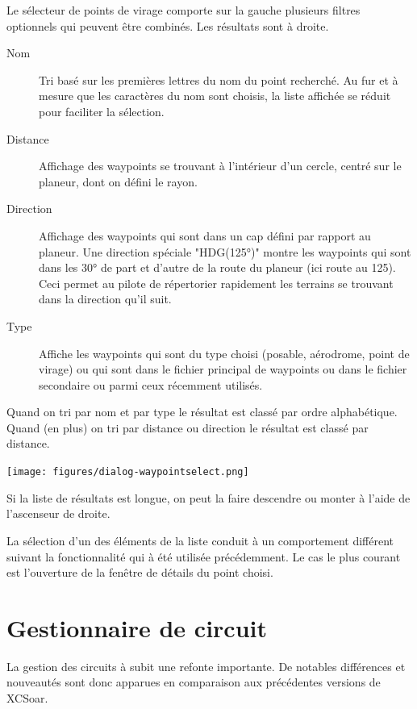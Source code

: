 Le sélecteur de points de virage comporte sur la gauche plusieurs filtres optionnels qui peuvent être combinés. Les résultats sont à droite. 
\begin{description}
\item[Nom] Tri basé sur les premières lettres du nom du point recherché. Au fur et à mesure que les caractères du nom sont choisis, la liste affichée se réduit pour faciliter la sélection.\\
\item[Distance] Affichage des waypoints se trouvant à l'intérieur d'un cercle, centré sur le planeur, dont on défini le rayon.\\
\item[Direction] Affichage des waypoints qui sont dans un cap défini par rapport au planeur.
 Une direction spéciale "HDG(125°)" montre les waypoints qui sont dans les 30° de part et d'autre de la route du planeur (ici route au 125). Ceci permet au pilote de répertorier rapidement les terrains se trouvant dans la direction qu'il suit.\\
\item[Type] Affiche les waypoints qui sont du type choisi (posable, aérodrome, point de virage) ou qui sont dans le fichier principal de waypoints ou dans le fichier secondaire ou parmi ceux récemment utilisés.\\
\end{description}
Quand on tri par nom et par type le résultat est classé par ordre alphabétique. Quand (en plus) on tri par distance ou direction le résultat est classé par distance.

\begin{center}
\texttt{[image: figures/dialog-waypointselect.png]}
\end{center}

Si la liste de résultats est longue, on peut la faire descendre ou monter à l'aide de l'ascenseur de droite. 

La sélection d'un des éléments de la liste conduit à un comportement différent suivant la fonctionnalité qui à été utilisée précédemment. Le cas le plus courant est l'ouverture de la fenêtre de détails du point choisi. 

\section{Gestionnaire de circuit}\label{sec:task-manager-dialog}
\begin{it}  La gestion des circuits à subit une refonte importante. De notables différences et nouveautés sont donc apparues en comparaison aux précédentes versions de XCSoar.\end{it}


